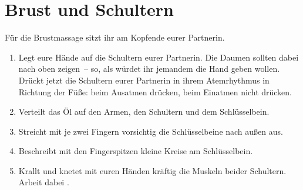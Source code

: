 \section{Brust und Schultern}

Für die Brustmassage sitzt ihr am Kopfende eurer Partnerin.

\begin{enumerate}
  \item {} Legt eure Hände auf die Schultern eurer Partnerin. Die Daumen sollten dabei nach oben zeigen~-- so, als würdet ihr jemandem die Hand geben wollen. Drückt jetzt die Schultern eurer Partnerin in ihrem Atemrhythmus in Richtung der Füße: beim Ausatmen drücken, beim Einatmen nicht drücken.
  \item {} Verteilt das Öl auf den Armen, den Schultern und dem Schlüsselbein.
  \item {} Streicht mit je zwei Fingern vorsichtig die Schlüsselbeine nach außen aus.
  \item {} Beschreibt mit den Fingerspitzen kleine Kreise am Schlüsselbein.
  \item {} Krallt und knetet mit euren Händen kräftig die Muskeln beider Schultern. Arbeit dabei .
\end{enumerate}
